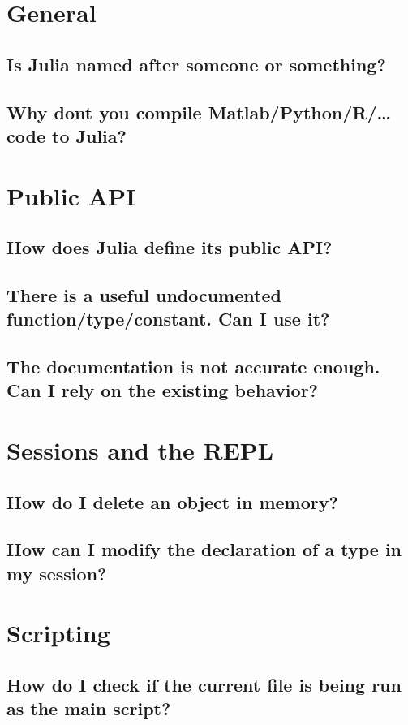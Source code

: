     \section{General}
    \subsection{Is Julia named after someone or something?}
    \subsection{Why don{\textquotesingle}t you compile Matlab/Python/R/… code to Julia?}
    \section{Public API}
    \subsection{How does Julia define its public API?}
    \subsection{There is a useful undocumented function/type/constant. Can I use it?}
    \subsection{The documentation is not accurate enough. Can I rely on the existing behavior?}
    \section{Sessions and the REPL}
    \subsection{How do I delete an object in memory?}
    \subsection{How can I modify the declaration of a type in my session?}
    \section{Scripting}
    \subsection{How do I check if the current file is being run as the main script?}

